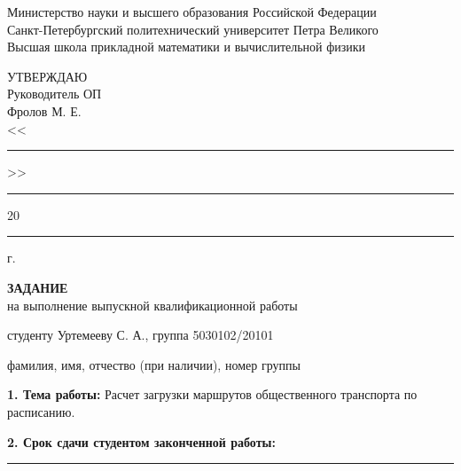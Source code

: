 \documentclass[14pt,a4paper]{extarticle}
\newcommand{\shortblank}[1]{\rule{#1}{0.4pt}}
\begin{document}
\begin{center}
Министерство науки и высшего образования Российской Федерации\\
Санкт-Петербургский политехнический университет Петра Великого\\
Высшая школа прикладной математики и вычислительной физики
\end{center}

\vspace{1.2em}

\begin{flushright}
\begin{minipage}{0.43\textwidth}
УТВЕРЖДАЮ\\
Руководитель ОП\\
Фролов М. Е.\\
<<\shortblank{9mm}>> \shortblank{29mm} 20\shortblank{8mm} г.
\end{minipage}
\end{flushright}

\vspace{1.8em}

\begin{center}
\textbf{ЗАДАНИЕ}\\
на выполнение выпускной квалификационной работы
\end{center}

\vspace{1.1em}

студенту Уртемееву С. А., группа 5030102/20101

\begin{center}
\small фамилия, имя, отчество (при наличии), номер группы
\end{center}

\vspace{0.8em}

\textbf{1. Тема работы:} Расчет загрузки маршрутов общественного транспорта по расписанию.

\vspace{0.7em}

\textbf{2. Срок сдачи студентом законченной работы:} \shortblank{45mm}

\vspace{0.7em}
\end{document}
